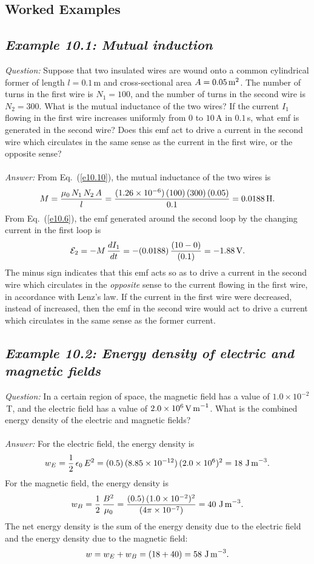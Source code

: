 \subsection{Worked Examples}
\subsection*{\em Example 10.1: Mutual induction}
{\em Question:} Suppose that two insulated wires are wound onto a common
cylindrical former of length $l=0.1$\,m and cross-sectional area
$A=0.05\,{\rm m}^2$. The number of turns in the first wire is $N_1=100$, and
the number of turns in the second wire is $N_2=300$. What is the mutual
inductance of the two wires? If the current $I_1$ flowing in the
first wire increases uniformly from 0 to $10$\,A in $0.1$\,s, what emf is
generated in the second wire? Does this emf act to drive a current in the
second wire which circulates in the same sense as the current in the first wire,
or the opposite sense? \\
~\\
{\em Answer:} From Eq.~(\ref{e10.10}), the mutual inductance of the two wires is
$$
M = \frac{\mu_0\,N_1\,N_2\,A}{l} = \frac{(1.26\times 10^{-6})\,(100)\,(300)\,(0.05)}{0.1}
= 0.0188\,{\rm H}.
$$
From Eq.~(\ref{e10.6}), the emf generated around the second loop by the changing current
in the first loop is
$$
{\cal E}_2 = - M\,\frac{dI_1}{d t}=
-(0.0188)\,\frac{(10-0)}{(0.1)} = -1.88 \,{\rm V}.
$$
The minus sign indicates that this emf acts so as to drive a current in the
second wire which circulates in the {\em opposite}\/ sense to the current flowing
in the first wire, in accordance with Lenz's law. If the current in the
first wire were decreased, instead of increased, then the emf in the second
wire would act to drive a current which circulates in the same sense as
the former current.


\subsection*{\em Example 10.2: Energy density of electric and magnetic fields}
{\em Question:} In a certain region of space, the magnetic field has a value
of $1.0\times 10^{-2}$\,T, and the electric field has a value
of $2.0\times 10^6\,{\rm V\,m}^{-1}$. What is the combined energy density of
the electric and magnetic fields?\\
~\\
{\em Answer:} For the electric field, the energy density is
$$
w_E = \frac{1}{2}\,\epsilon_0\,E^2 =
(0.5)\,(8.85\times 10^{-12}) \,(2.0\times 10^6)^2 = 18\,\,{\rm J\,m}^{-3}.
$$
For the magnetic field, the energy density is
$$
w_B = \frac{1}{2} \,\frac{B^2}{\mu_0} = \frac{(0.5)\,(1.0\times 10^{-2})^2}
{(4\pi\times 10^{-7})} = 40\,\,{\rm J\,m}^{-3}.
$$
The net energy density is the sum of the energy density due to the electric
field and the energy density due to the magnetic field:
$$
w = w_E + w_B = (18 + 40) = 58\,\,{\rm J\,m}^{-3}.
$$


